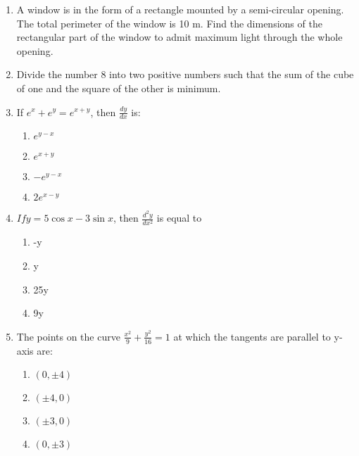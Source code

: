 \begin{enumerate}
\item A window is in the form of a rectangle mounted by a semi-circular opening. The total perimeter of the window is 10 m. Find the dimensions of the rectangular part of the window to admit maximum light through the whole opening.

\item Divide the number 8 into two positive numbers such that the sum of the cube of one and the square of the other is minimum.

\item If $e^{x}+e^{y}=e^{x+y}$, then $\frac{dy}{dx}$ is:
\begin{enumerate}
\item $e^{y-x}$
\item $e^{x+y}$
\item $-e^{y-x}$
\item $2 e^{x-y}$
\end{enumerate}

\item $If y=5\cos x-3\sin x$, then $\frac{d^{2}y}{dx^{2}}$ is equal to
\begin{enumerate}
\item -y
\item y
\item 25y
\item 9y
\end{enumerate}

\item The points on the curve $\frac{x^2}{9}+\frac{y^2}{16}=1$ at which the tangents are parallel to y-axis are:
\begin{enumerate}

\item $(0,\pm 4)$
\item $(\pm 4,0)$
\item $(\pm 3,0)$
\item $(0,\pm 3)$

\end{enumerate}

\end{enumerate}

%

